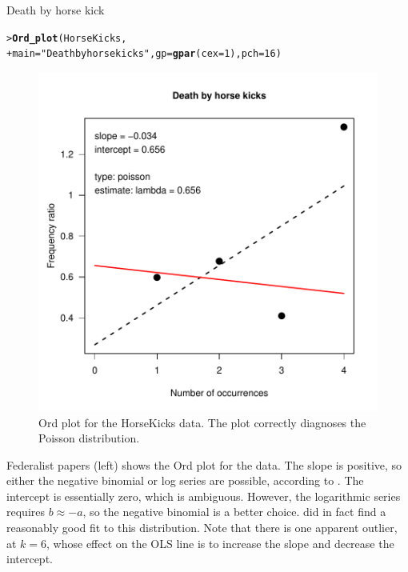 \documentclass[10pt,krantz2]{krantz}\usepackage[]{graphicx}\usepackage[]{color}
\makeatletter
\newcommand{\hlnum}[1]{\textcolor[rgb]{0.686,0.059,0.569}{#1}}%
\newcommand{\hlstr}[1]{\textcolor[rgb]{0.192,0.494,0.8}{#1}}%
\newcommand{\hlstd}[1]{\textcolor[rgb]{0.345,0.345,0.345}{#1}}%
\newcommand{\hlkwc}[1]{\textcolor[rgb]{0.333,0.667,0.333}{#1}}%
\newcommand{\hlkwd}[1]{\textcolor[rgb]{0.737,0.353,0.396}{\textbf{#1}}}%
\newenvironment{kframe}{%
 \def\at@end@of@kframe{}%
 \ifinner\ifhmode%
  \def\at@end@of@kframe{\end{minipage}}%
  \begin{minipage}{\columnwidth}%
 \fi\fi%
 \def\FrameCommand##1{\hskip\@totalleftmargin \hskip-\fboxsep
 \colorbox{shadecolor}{##1}\hskip-\fboxsep
     \hskip-\linewidth \hskip-\@totalleftmargin \hskip\columnwidth}%
 \MakeFramed {\advance\hsize-\width
   \@totalleftmargin\z@ \linewidth\hsize
   \@setminipage}}%
 {\par\unskip\endMakeFramed%
 \at@end@of@kframe}
\newenvironment{knitrout}{}{} %
\renewenvironment{knitrout}{\small\renewcommand{\baselinestretch}{.85}}{} %
\makeatother
\begin{document}
\begin{Example}[horsekick3]{Death by horse kick}
\begin{knitrout}
\color{fgcolor}\begin{kframe}
\begin{alltt}
\hlstd{> }\hlkwd{Ord_plot}\hlstd{(HorseKicks,}
\hlstd{+ }         \hlkwc{main} \hlstd{=} \hlstr{"Death by horse kicks"}\hlstd{,} \hlkwc{gp} \hlstd{=} \hlkwd{gpar}\hlstd{(}\hlkwc{cex} \hlstd{=} \hlnum{1}\hlstd{),} \hlkwc{pch} \hlstd{=} \hlnum{16}\hlstd{)}
\end{alltt}
\end{kframe}\begin{figure}[!htbp]

\centerline{\includegraphics[width=.5\textwidth]{ch03/fig/ordplot2-1} }

\caption[Ord plot for the HorseKicks data]{Ord plot for the HorseKicks data. The plot correctly diagnoses the Poisson distribution.\label{fig:ordplot2}}
\end{figure}


\end{knitrout}
\end{Example}

\begin{Example}[madison3]{Federalist papers}
 (left) shows the Ord plot for the  data.
The slope is positive, so either the
negative binomial or log series are possible, according to .
The intercept is
essentially zero, which is ambiguous.  However, the logarithmic
series requires \(b \approx  - a\), so the negative binomial is a
better choice.  \citet{MostellerWallace:63,MostellerWallace:84} did in fact find a reasonably
good fit to this distribution. Note that there is one apparent outlier,
at $k=6$, whose effect on the OLS line is to increase the slope and decrease
the intercept.
\end{Example}
\end{document}

